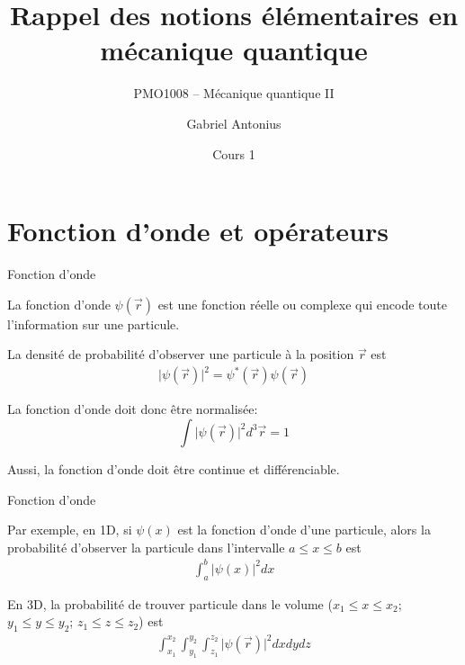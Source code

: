 \documentclass[xcolor=svgnames,t,aspectratio=169,handout]{uqtrcours}
\title[]{Rappel des notions élémentaires en mécanique quantique}
\subtitle{PMO1008 -- Mécanique quantique II}
\author[]{Gabriel Antonius}
\date[]{Cours 1}
\begin{document}
\begin{frame}
  \titlepage
  \thispagestyle{empty}
\end{frame}


\begin{frame}
  \tableofcontents
\end{frame}

\section{Fonction d'onde et opérateurs}
\frame{\sectionpage}


\begin{frame}{Fonction d'onde}

La fonction d'onde $\psi(\vec r)$
  est une fonction réelle ou complexe
  qui encode toute l'information
  sur une particule.

\medskip

La densité de probabilité d'observer une particule à la position $\vec r$
  est
\begin{align}
  \vert \psi(\vec r) \vert^2 = \psi^*(\vec r) \psi(\vec r)
\end{align}

La fonction d'onde doit donc être normalisée:
\begin{equation}
  \int \vert  \psi(\vec r) \vert^2 d^3\vec r = 1
\end{equation}

Aussi, la fonction d'onde doit être continue et différenciable.


\end{frame}



\begin{frame}{Fonction d'onde}

Par exemple, en 1D, si $\psi(x)$ est la fonction d'onde d'une particule,
  alors la probabilité d'observer la particule dans l'intervalle $a \le x \le b$ est
\begin{align}
  \int_a^b \vert \psi(x) \vert^2 dx
\end{align}

\medskip

En 3D, %
  la probabilité de trouver particule dans le volume
  ($x_1 \le x \le x_2$;
   $y_1 \le y \le y_2$;
   $z_1 \le z \le z_2$)
  est
\begin{align}
  \int_{x_1}^{x_2}
  \int_{y_1}^{y_2}
  \int_{z_1}^{z_2}
  \vert \psi(\vec r) \vert^2 dx dy dz
\end{align}




\end{frame}
\end{document}
